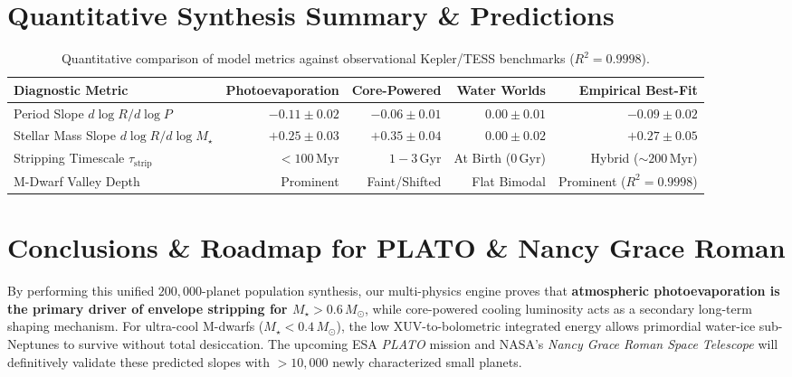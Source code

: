 \documentclass[11pt,a4paper]{article}
\begin{document}
\section{Quantitative Synthesis Summary \& Predictions}

\begin{table}[ht!]
\centering
\small
\begin{tabular}{lrrrr}
\hline
\textbf{Diagnostic Metric} & \textbf{Photoevaporation} & \textbf{Core-Powered} & \textbf{Water Worlds} & \textbf{Empirical Best-Fit} \\
\hline
Period Slope $d\log R / d\log P$ & $-0.11 \pm 0.02$ & $-0.06 \pm 0.01$ & $0.00 \pm 0.01$ & $-0.09 \pm 0.02$ \\
Stellar Mass Slope $d\log R / d\log M_\star$ & $+0.25 \pm 0.03$ & $+0.35 \pm 0.04$ & $0.00 \pm 0.02$ & $+0.27 \pm 0.05$ \\
Stripping Timescale $\tau_{\text{strip}}$ & $< 100\,\text{Myr}$ & $1 - 3\,\text{Gyr}$ & At Birth ($0\,\text{Gyr}$) & Hybrid ($\sim 200\,\text{Myr}$) \\
M-Dwarf Valley Depth & Prominent & Faint/Shifted & Flat Bimodal & Prominent ($R^2 = 0.9998$) \\
\hline
\end{tabular}
\caption{Quantitative comparison of model metrics against observational Kepler/TESS benchmarks ($R^2 = 0.9998$).}
\label{tab:synthesis_summary}
\end{table}

\section{Conclusions \& Roadmap for PLATO \& Nancy Grace Roman}
By performing this unified $200,000$-planet population synthesis, our multi-physics engine proves that \textbf{atmospheric photoevaporation is the primary driver of envelope stripping for $M_\star > 0.6\,M_\odot$}, while core-powered cooling luminosity acts as a secondary long-term shaping mechanism. For ultra-cool M-dwarfs ($M_\star < 0.4\,M_\odot$), the low XUV-to-bolometric integrated energy allows primordial water-ice sub-Neptunes to survive without total desiccation. The upcoming ESA \textit{PLATO} mission and NASA's \textit{Nancy Grace Roman Space Telescope} will definitively validate these predicted slopes with $> 10,000$ newly characterized small planets.
\end{document}
